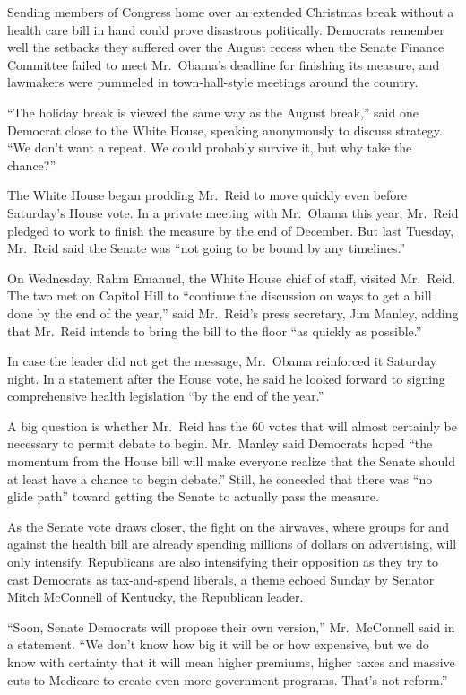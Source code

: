﻿\documentclass[12pt]{article}
\begin{document}
Sending members of Congress home over an extended Christmas break without a health care bill in hand
could prove disastrous politically. Democrats remember well the setbacks they suffered over the
August recess when the Senate Finance Committee failed to meet Mr.~Obama's deadline for finishing
its measure, and lawmakers were pummeled in town-hall-style meetings around the country.

``The holiday break is viewed the same way as the August break,'' said one Democrat close to the
White House, speaking anonymously to discuss strategy. ``We don't want a repeat. We could probably
survive it, but why take the chance?''

The White House began prodding Mr.~Reid to move quickly even before Saturday's House vote. In a
private meeting with Mr.~Obama this year, Mr.~Reid pledged to work to finish the measure by the end
of December. But last Tuesday, Mr.~Reid said the Senate was ``not going to be bound by any
timelines.''

On Wednesday, Rahm Emanuel, the White House chief of staff, visited Mr.~Reid. The two met on Capitol
Hill to ``continue the discussion on ways to get a bill done by the end of the year,'' said
Mr.~Reid's press secretary, Jim Manley, adding that Mr.~Reid intends to bring the bill to the floor
``as quickly as possible.''

In case the leader did not get the message, Mr.~Obama reinforced it Saturday night. In a statement
after the House vote, he said he looked forward to signing comprehensive health legislation ``by the
end of the year.''

A big question is whether Mr.~Reid has the 60 votes that will almost certainly be necessary to
permit debate to begin. Mr.~Manley said Democrats hoped ``the momentum from the House bill will make
everyone realize that the Senate should at least have a chance to begin debate.'' Still, he conceded
that there was ``no glide path'' toward getting the Senate to actually pass the measure.

As the Senate vote draws closer, the fight on the airwaves, where groups for and against the health
bill are already spending millions of dollars on advertising, will only intensify. Republicans are
also intensifying their opposition as they try to cast Democrats as tax-and-spend liberals, a theme
echoed Sunday by Senator Mitch McConnell of Kentucky, the Republican leader.

``Soon, Senate Democrats will propose their own version,'' Mr.~McConnell said in a statement. ``We
don't know how big it will be or how expensive, but we do know with certainty that it will mean
higher premiums, higher taxes and massive cuts to Medicare to create even more government programs.
That's not reform.''
\end{document}
